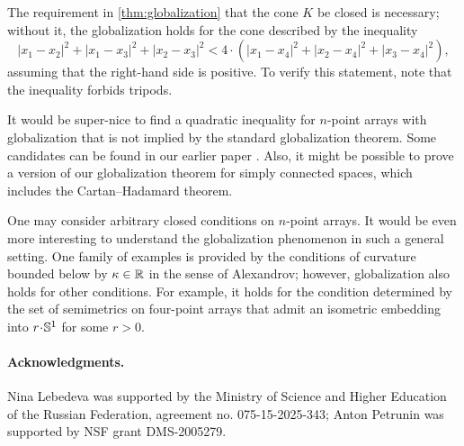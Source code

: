 The requirement in \ref{thm:globalization} that the cone $K$ be closed is necessary;
without it, the globalization holds for the cone described by the inequality
\[|x_1-x_2|^2+|x_1-x_3|^2+|x_2-x_3|^2<4\cdot(|x_1-x_4|^2+|x_2-x_4|^2+|x_3-x_4|^2),\]
assuming that the right-hand side is positive.
To verify this statement, note that the inequality forbids tripods.

It would be super-nice to find a quadratic inequality for $n$-point arrays with globalization that is not implied by the standard globalization theorem.
Some candidates can be found in our earlier paper \cite{lebedeva-petrunin-zolotov}.
Also, it might be possible to prove a version of our globalization theorem
for simply connected spaces, which includes the Cartan--Hadamard theorem.

One may consider arbitrary closed conditions on $n$-point arrays.
It would be even more interesting to understand the globalization phenomenon in such a general setting.
One family of examples is provided by the conditions of curvature bounded below by $\kappa\in\mathbb{R}$ in the sense of Alexandrov; however, globalization also holds for other conditions.
For example, it holds for the condition determined by the set of semimetrics on four-point arrays that admit an isometric embedding into $r\cdot\SSS^1$ for some $r>0$.

\paragraph{Acknowledgments.}
Nina Lebedeva was supported by the Ministry of Science and Higher Education of the Russian Federation, agreement no. 075-15-2025-343;
Anton Petrunin was supported by NSF grant DMS-2005279.



